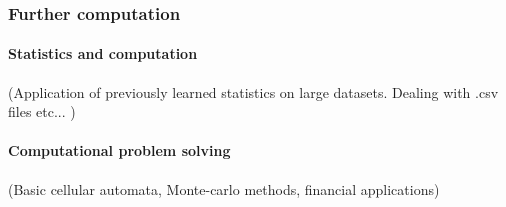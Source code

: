 \documentclass[12pt]{report}
\begin{document}
    \subsubsection{Further computation} 
        \paragraph*{Statistics and computation} (Application of previously learned statistics on large datasets. Dealing with .csv files etc... )
        \paragraph*{Computational problem solving} (Basic cellular automata, Monte-carlo methods, financial applications)
\end{document}

